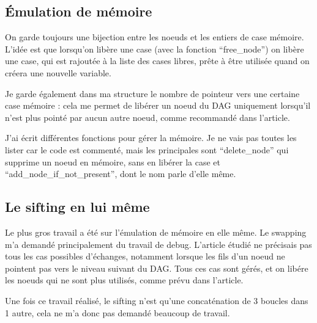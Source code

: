\documentclass[a4paper,10pt]{article}
\begin{document}
\subsection{Émulation de mémoire}
On garde toujours une bijection entre les noeuds et les entiers de case mémoire. L'idée est que lorsqu'on libère une case (avec la fonction ``free\_node'') on libère une case, qui est rajoutée à la liste des 
cases libres, prête à être utilisée quand on créera une nouvelle variable.

Je garde également dans ma structure le nombre de pointeur vers une certaine case mémoire : cela me permet de libérer un noeud du DAG uniquement lorsqu'il n'est plus pointé par aucun autre
noeud, comme recommandé dans l'article.

J'ai écrit différentes fonctions pour gérer la mémoire. Je ne vais pas toutes les lister car le code est commenté, mais les principales sont ``delete\_node'' qui supprime un noeud en mémoire, sans en libérer la
case et ``add\_node\_if\_not\_present'', dont le nom parle d'elle même.

\subsection{Le sifting en lui même}
Le plus gros travail a été sur l'émulation de mémoire en elle même. Le swapping m'a demandé principalement du travail de debug. L'article étudié ne précisais pas tous les cas possibles d'échanges, 
notamment lorsque les fils d'un noeud ne pointent pas vers le niveau suivant du DAG. Tous ces cas sont gérés, et on libére les noeuds qui ne sont plus utilisés, comme prévu dans l'article.

Une fois ce travail réalisé, le sifting n'est qu'une concaténation de 3 boucles dans 1 autre, cela ne m'a donc pas demandé beaucoup de travail.
\end{document}
